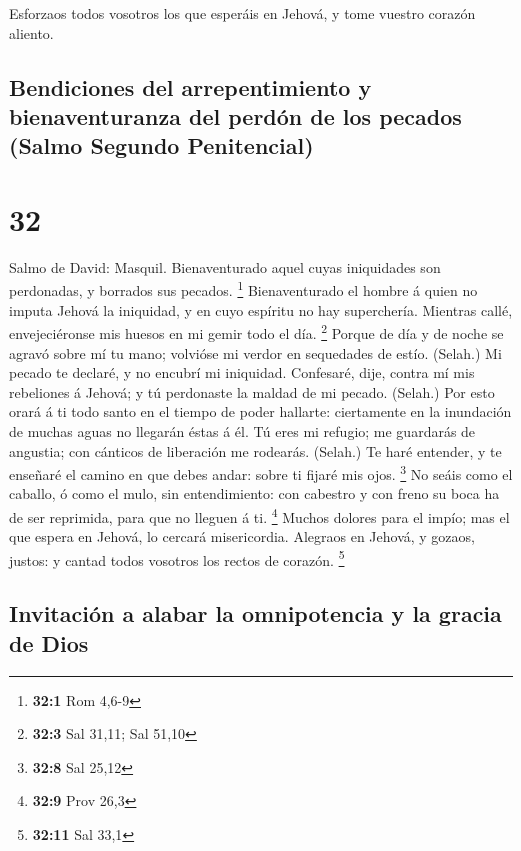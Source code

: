  Esforzaos todos vosotros los que esperáis en Jehová, y
tome vuestro corazón aliento.

\hypertarget{bendiciones-del-arrepentimiento-y-bienaventuranza-del-perduxf3n-de-los-pecados-salmo-segundo-penitencial}{%
\subsection{Bendiciones del arrepentimiento y bienaventuranza del perdón
de los pecados (Salmo Segundo
Penitencial)}\label{bendiciones-del-arrepentimiento-y-bienaventuranza-del-perduxf3n-de-los-pecados-salmo-segundo-penitencial}}

\hypertarget{section-31}{%
\section{32}\label{section-31}}

 Salmo de David: Masquil. Bienaventurado aquel cuyas
iniquidades son perdonadas, y borrados sus pecados. \footnote{\textbf{32:1}
  Rom 4,6-9}  Bienaventurado el hombre á quien no imputa
Jehová la iniquidad, y en cuyo espíritu no hay superchería. 
Mientras callé, envejeciéronse mis huesos en mi gemir todo el día.
\footnote{\textbf{32:3} Sal 31,11; Sal 51,10}  Porque de día
y de noche se agravó sobre mí tu mano; volvióse mi verdor en sequedades
de estío. (Selah.)  Mi pecado te declaré, y no encubrí mi
iniquidad. Confesaré, dije, contra mí mis rebeliones á Jehová; y tú
perdonaste la maldad de mi pecado. (Selah.)  Por esto orará
á ti todo santo en el tiempo de poder hallarte: ciertamente en la
inundación de muchas aguas no llegarán éstas á él.  Tú eres
mi refugio; me guardarás de angustia; con cánticos de liberación me
rodearás. (Selah.)  Te haré entender, y te enseñaré el
camino en que debes andar: sobre ti fijaré mis ojos. \footnote{\textbf{32:8}
  Sal 25,12}  No seáis como el caballo, ó como el mulo, sin
entendimiento: con cabestro y con freno su boca ha de ser reprimida,
para que no lleguen á ti. \footnote{\textbf{32:9} Prov 26,3}
 Muchos dolores para el impío; mas el que espera en Jehová,
lo cercará misericordia.  Alegraos en Jehová, y gozaos,
justos: y cantad todos vosotros los rectos de corazón. \footnote{\textbf{32:11}
  Sal 33,1}

\hypertarget{invitaciuxf3n-a-alabar-la-omnipotencia-y-la-gracia-de-dios}{%
\subsection{Invitación a alabar la omnipotencia y la gracia de
Dios}\label{invitaciuxf3n-a-alabar-la-omnipotencia-y-la-gracia-de-dios}}

